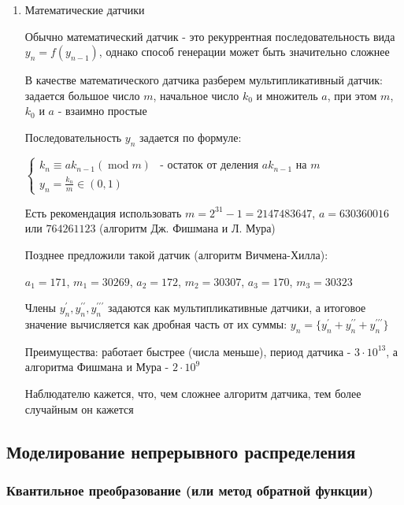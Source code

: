 \documentclass[12pt]{article}
\begin{document}
\begin{enumerate}[label*=\Roman*. ]
    \item Математические датчики

    Обычно математический датчик - это рекуррентная последовательность вида $y_n = f(y_{n - 1})$, однако способ генерации может быть значительно сложнее

    В качестве математического датчика разберем мультипликативный датчик: задается большое число $m$, начальное число $k_0$ и множитель $a$, при этом $m$, $k_0$ и $a$ - взаимно простые

    Последовательность $y_n$ задается по формуле:

    $\begin{cases}
        k_n \equiv a k_{n - 1} (\operatorname{mod} m) & \text{- остаток от деления }ak_{n - 1}\text{ на }m \\
        y_n = \frac{k_n}{m} \in (0, 1)
    \end{cases}$

    Есть рекомендация использовать $m = 2^{31} - 1 = 2147483647$, $a = 630360016$ или $764261123$ (алгоритм Дж. Фишмана и Л. Мура)

    \mediumvspace

    Позднее предложили такой датчик (алгоритм Вичмена-Хилла):

    $a_1 = 171$, $m_1 = 30269$, $a_2 = 172$, $m_2 = 30307$, $a_3 = 170$, $m_3 = 30323$ 

    Члены $y_n^\prime, y_n^{\prime\prime}, y_n^{\prime\prime\prime}$ задаются как мультипликативные датчики, а итоговое значение вычисляется как дробная часть от их суммы: $y_n = \{y_n^\prime + y_n^{\prime\prime} + y_n^{\prime\prime\prime}\}$

    Преимущества: работает быстрее (числа меньше), период датчика - $3 \cdot 10^{13}$, а алгоритма Фишмана и Мура - $2 \cdot 10^9$

    Наблюдателю кажется, что, чем сложнее алгоритм датчика, тем более случайным он кажется

\end{enumerate}

\subsection{Моделирование непрерывного распределения}

\subsubsection{Квантильное преобразование (или метод обратной функции)}
\end{document}
